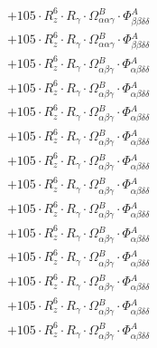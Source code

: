 \documentclass{article}
\begin{document}
\begin{subequations}
\begin{gather}
\begin{array}{c}
 \\[0.2em] 		 + 105 \cdot R_{z}^{6} \cdot R_{\gamma{}} \cdot \Omega{}^{B}_{\alpha{}\alpha{}\gamma{}} \cdot \Phi{}^{A}_{\beta{}\beta{}\delta{}\delta{}} 
 \\[0.2em] 		 + 105 \cdot R_{z}^{6} \cdot R_{\gamma{}} \cdot \Omega{}^{B}_{\alpha{}\alpha{}\gamma{}} \cdot \Phi{}^{A}_{\beta{}\beta{}\delta{}\delta{}} 
 \\[0.2em] 		 + 105 \cdot R_{z}^{6} \cdot R_{\gamma{}} \cdot \Omega{}^{B}_{\alpha{}\beta{}\gamma{}} \cdot \Phi{}^{A}_{\alpha{}\beta{}\delta{}\delta{}} 
 \\[0.2em] 		 + 105 \cdot R_{z}^{6} \cdot R_{\gamma{}} \cdot \Omega{}^{B}_{\alpha{}\beta{}\gamma{}} \cdot \Phi{}^{A}_{\alpha{}\beta{}\delta{}\delta{}} 
 \\[0.2em] 		 + 105 \cdot R_{z}^{6} \cdot R_{\gamma{}} \cdot \Omega{}^{B}_{\alpha{}\beta{}\gamma{}} \cdot \Phi{}^{A}_{\alpha{}\beta{}\delta{}\delta{}} 
 \\[0.2em] 		 + 105 \cdot R_{z}^{6} \cdot R_{\gamma{}} \cdot \Omega{}^{B}_{\alpha{}\beta{}\gamma{}} \cdot \Phi{}^{A}_{\alpha{}\beta{}\delta{}\delta{}} 
 \\[0.2em] 		 + 105 \cdot R_{z}^{6} \cdot R_{\gamma{}} \cdot \Omega{}^{B}_{\alpha{}\beta{}\gamma{}} \cdot \Phi{}^{A}_{\alpha{}\beta{}\delta{}\delta{}} 
 \\[0.2em] 		 + 105 \cdot R_{z}^{6} \cdot R_{\gamma{}} \cdot \Omega{}^{B}_{\alpha{}\beta{}\gamma{}} \cdot \Phi{}^{A}_{\alpha{}\beta{}\delta{}\delta{}} 
 \\[0.2em] 		 + 105 \cdot R_{z}^{6} \cdot R_{\gamma{}} \cdot \Omega{}^{B}_{\alpha{}\beta{}\gamma{}} \cdot \Phi{}^{A}_{\alpha{}\beta{}\delta{}\delta{}} 
 \\[0.2em] 		 + 105 \cdot R_{z}^{6} \cdot R_{\gamma{}} \cdot \Omega{}^{B}_{\alpha{}\beta{}\gamma{}} \cdot \Phi{}^{A}_{\alpha{}\beta{}\delta{}\delta{}} 
 \\[0.2em] 		 + 105 \cdot R_{z}^{6} \cdot R_{\gamma{}} \cdot \Omega{}^{B}_{\alpha{}\beta{}\gamma{}} \cdot \Phi{}^{A}_{\alpha{}\beta{}\delta{}\delta{}} 
 \\[0.2em] 		 + 105 \cdot R_{z}^{6} \cdot R_{\gamma{}} \cdot \Omega{}^{B}_{\alpha{}\beta{}\gamma{}} \cdot \Phi{}^{A}_{\alpha{}\beta{}\delta{}\delta{}} 
 \\[0.2em] 		 + 105 \cdot R_{z}^{6} \cdot R_{\gamma{}} \cdot \Omega{}^{B}_{\alpha{}\beta{}\gamma{}} \cdot \Phi{}^{A}_{\alpha{}\beta{}\delta{}\delta{}} 
 \\[0.2em] 		 + 105 \cdot R_{z}^{6} \cdot R_{\gamma{}} \cdot \Omega{}^{B}_{\alpha{}\beta{}\gamma{}} \cdot \Phi{}^{A}_{\alpha{}\beta{}\delta{}\delta{}} 

\end{array}
\end{gather}
\end{subequations}
\end{document}
